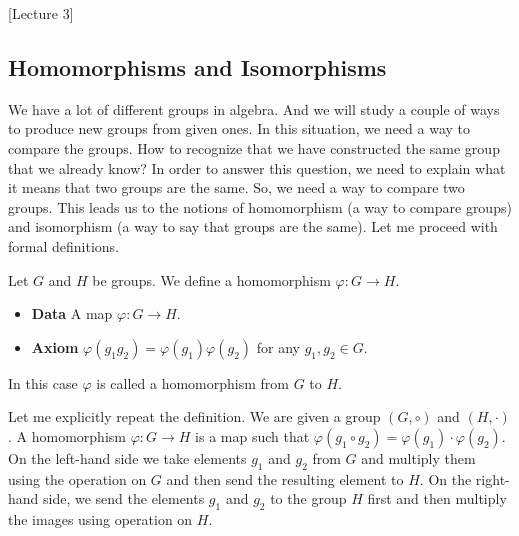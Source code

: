 [Lecture 3]


\subsection{Homomorphisms and Isomorphisms}

We have a lot of different groups in algebra.
And we will study a couple of ways to produce new groups from given ones.
In this situation, we need a way to compare the groups.
How to recognize that we have constructed the same group that we already know?
In order to answer this question, we need to explain what it means that two groups are the same.
So, we need a way to compare two groups.
This leads us to the notions of homomorphism (a way to compare groups) and isomorphism (a way to say that groups are the same).
Let me proceed with formal definitions.

\begin{definition}
Let $G$ and $H$ be groups.
We define a homomorphism $\varphi\colon G\to H$.
\begin{itemize}
\item \textbf{Data} A map $\varphi\colon G\to H$.

\item \textbf{Axiom} $\varphi(g_1g_2) = \varphi(g_1) \varphi(g_2)$ for any $g_1,g_2\in G$.
\end{itemize}
In this case $\varphi$ is called a homomorphism from $G$ to $H$.
\end{definition}

\begin{remark}
Let me explicitly repeat the definition.
We are given a group $(G, \circ)$ and $(H,\cdot)$.
A homomorphism $\varphi \colon G\to H$ is a map such that $\varphi(g_1 \circ g_2) = \varphi(g_1) \cdot \varphi(g_2)$.
On the left-hand side we take elements $g_1$ and $g_2$ from $G$ and multiply them using the operation on $G$ and then send the resulting element to $H$.
On the right-hand side, we send the elements $g_1$ and $g_2$ to the group $H$ first and then multiply the images using operation on $H$.
\end{remark}

